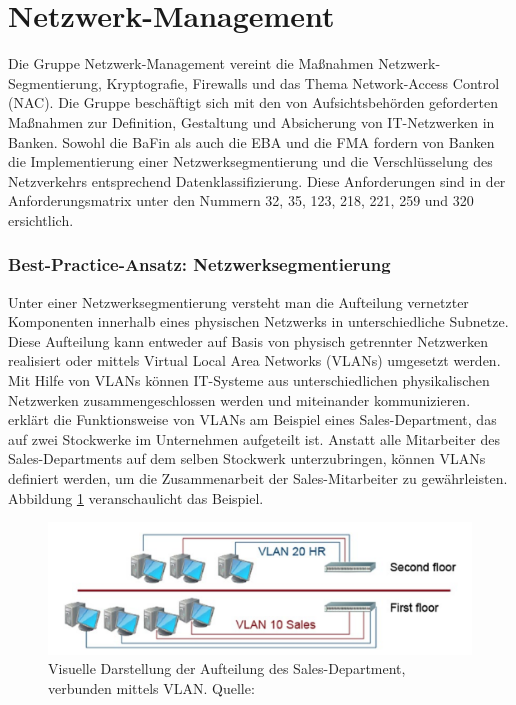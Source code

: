 \section{Netzwerk-Management}
Die Gruppe \glqq{}Netzwerk-Management\grqq{} vereint die Maßnahmen \glqq{}Netzwerk-Segmentierung\grqq{}, \glqq{}Kryptografie\grqq{}, \glqq{}Firewalls\grqq{} und das Thema \glqq{}Network-Access Control\grqq{} (NAC). Die Gruppe beschäftigt sich mit den von Aufsichtsbehörden geforderten Maßnahmen zur Definition, Gestaltung und Absicherung von IT-Netzwerken in Banken.
\bigbreak
Sowohl die BaFin als auch die EBA und die FMA fordern von Banken die Implementierung einer Netzwerksegmentierung und die Verschlüsselung des Netzverkehrs entsprechend Datenklassifizierung. Diese Anforderungen sind in der Anforderungsmatrix unter den Nummern 32, 35, 123, 218, 221, 259 und 320 ersichtlich.
\subsubsection{Best-Practice-Ansatz: Netzwerksegmentierung}
Unter einer Netzwerksegmentierung versteht man die Aufteilung vernetzter Komponenten innerhalb eines physischen Netzwerks in unterschiedliche Subnetze. Diese Aufteilung kann entweder auf Basis von physisch getrennter Netzwerken realisiert oder mittels \glqq{}Virtual Local Area Networks\grqq{} (VLANs) umgesetzt werden. Mit Hilfe von VLANs können IT-Systeme aus unterschiedlichen physikalischen Netzwerken zusammengeschlossen werden und miteinander kommunizieren. \textcite{SheikhAhmedF2020CSCS} erklärt die Funktionsweise von VLANs am Beispiel eines Sales-Department, das auf zwei Stockwerke im Unternehmen aufgeteilt ist. Anstatt alle Mitarbeiter des Sales-Departments auf dem selben Stockwerk unterzubringen, können VLANs definiert werden, um die Zusammenarbeit der Sales-Mitarbeiter zu gewährleisten. Abbildung \ref{fig:VLAN} veranschaulicht das Beispiel.

\begin{figure}[H]
  \centering
  \includegraphics[width=\linewidth]{images/uploads/a_figure_08.png}
  \caption{Visuelle Darstellung der Aufteilung des Sales-Department, verbunden mittels VLAN. Quelle: \textcite{SheikhAhmedF2020CSCS}}
  \label{fig:VLAN}
\end{figure}
\bigbreak

